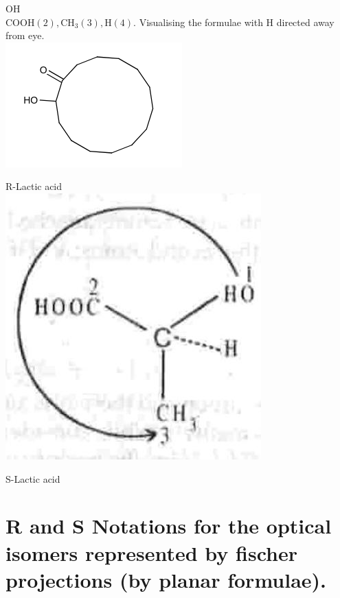 \documentclass[10pt]{article}
\begin{document}
OH\\
$\mathrm{COOH}(2), \mathrm{CH}_{3}(3), \mathrm{H}(4)$. Visualising the formulae with H directed away from eye.\\
\includegraphics{smile-51a3ff6ba12ec5943d803967b6a7ab162c0ad3ce}

R-Lactic acid\\
\includegraphics[max width=\textwidth, center]{2025_01_28_8470952b98110cec3aabg-054}

S-Lactic acid

\section*{R and S Notations for the optical isomers represented by fischer projections (by planar formulae).}
\end{document}
